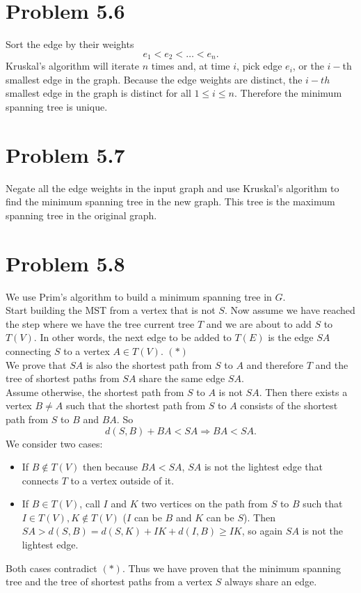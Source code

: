 \documentclass[12pt]{report}
\begin{document}
\section{Problem 5.6}
Sort the edge by their weights $$e_1 < e_2 < \ldots < e_n.$$
Kruskal's algorithm will iterate $n$ times and, at time $i$, pick edge $e_i$, or the $i-$th smallest edge in the graph. Because the edge weights are distinct, the $i-th$ smallest edge in the graph is distinct for all $1 \le i \le n$. Therefore the minimum spanning tree is unique.

\section{Problem 5.7}
Negate all the edge weights in the input graph and use Kruskal's algorithm to find the minimum spanning tree in the new graph. This tree is the maximum spanning tree in the original graph.

\section{Problem 5.8}
We use Prim's algorithm to build a minimum spanning tree in $G$. \\
Start building the MST from a vertex that is not $S$. Now assume we have reached the step where we have the tree current tree $T$ and we are about to add $S$ to $T(V)$. In other words, the next edge to be added to $T(E)$ is the edge $SA$ connecting $S$ to a vertex $A \in T(V)$. $(*)$\\
We prove that $SA$ is also the shortest path from $S$ to $A$ and therefore $T$ and the tree of shortest paths from $SA$ share the same edge $SA$. \\
Assume otherwise, the shortest path from $S$ to $A$ is not $SA$. Then there exists a vertex $B \ne A$ such that the shortest path from $S$ to $A$ consists of the shortest path from $S$ to $B$ and $BA$. So $$d(S,B) + BA < SA \Rightarrow BA < SA.$$
We consider two cases:
\begin{itemize}
  \item If $B \notin T(V)$ then because $BA < SA$, $SA$ is not the lightest edge that connects $T$ to a vertex outside of it.
  \item If $B \in T(V)$, call $I$ and $K$ two vertices on the path from $S$ to $B$ such that $I \in T(V), K \notin T(V)$ ($I$ can be $B$ and $K$ can be $S$). Then $SA > d(S,B) = d(S,K) + IK + d(I,B) \ge IK$, so again $SA$ is not the lightest edge.
\end{itemize}
Both cases contradict $(*)$. Thus we have proven that the minimum spanning tree and the tree of shortest paths from a vertex $S$ always share an edge.
\end{document}
